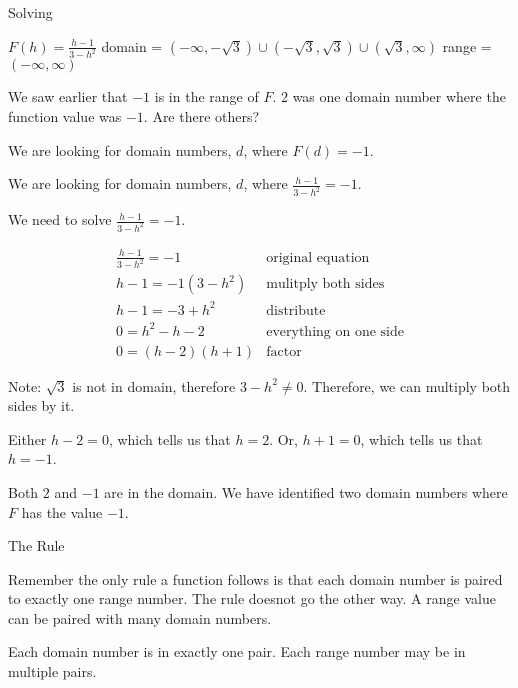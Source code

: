 \documentclass{ximera}
\begin{document}
\begin{example}   Solving

$F(h) = \frac{h-1}{3-h^2}$
domain = $(-\infty, -\sqrt{3}) \cup (-\sqrt{3}, \sqrt{3}) \cup (\sqrt{3}, \infty)$
range = $(-\infty, \infty)$


We saw earlier that $-1$ is in the range of $F$. $2$ was one domain number where the function value was $-1$. Are there others?


We are looking for domain numbers, $d$, where $F(d) = -1$.  

We are looking for domain numbers, $d$, where $\frac{h-1}{3-h^2} = -1$.  

We need to solve $\frac{h-1}{3-h^2} = -1$.



\[
\begin{array}{ll}
\frac{h-1}{3-h^2} = -1 &  \text{original equation}\\
h - 1 = -1 (3 - h^2)    &  \text{mulitply both sides} \\
h - 1 = -3 + h^2    &      \text{distribute}\\
0 = h^2 - h - 2    &      \text{everything on one side}\\
0 =(h-2)(h+1)    &   \text{factor}   
\end{array}
\]


Note:  $\sqrt{3}$ is not in domain, therefore $3 - h^2 \ne 0$. Therefore, we can multiply both sides by it.  

Either $h-2 = 0$, which tells us that $h = 2$. Or, $h+1 = 0$, which tells us that $h = -1$.

Both $2$ and $-1$ are in the domain.  We have identified two domain numbers where $F$ has the value $-1$.



\end{example}



\begin{remark}  The Rule

Remember the only rule a function follows is that each domain number is paired to exactly one range number.  The rule doesnot go the other way.  A range value can be paired with many domain numbers.

Each domain number is in exactly one pair.
Each range number may be in multiple pairs.


\end{remark}
\end{document}

